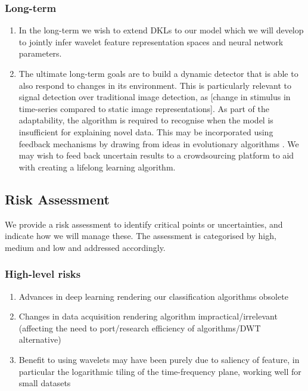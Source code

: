 \documentclass[12pt]{llncs}
\begin{document}
\subsubsection{Long-term}
\begin{enumerate}
	\item In the long-term we wish to extend DKLs to our model which we will develop to jointly infer wavelet feature representation spaces and neural network parameters.
	\item The ultimate long-term goals are to build a dynamic detector that is able to also respond to changes in its environment. This is particularly relevant to signal detection over traditional image detection, as [change in stimulus in time-series compared to static image representations]. As part of the adaptability, the algorithm is required to recognise when the model is insufficient for explaining novel data. This may be incorporated using feedback mechanisms by drawing from ideas in evolutionary algorithms \cite{coello2007evolutionary}. We may wish to feed back uncertain results to a crowdsourcing platform to aid with creating a lifelong learning algorithm.
\end{enumerate}



\subsection{Risk Assessment}
We provide a risk assessment to identify critical points or uncertainties, and indicate how we will manage these. The assessment is categorised by high, medium and low and addressed accordingly.

\subsubsection{High-level risks} 
\begin{enumerate} 
\item Advances in deep learning rendering our classification algorithms obsolete
\item Changes in data acquisition rendering algorithm impractical/irrelevant (affecting the need to port/research efficiency of algorithms/DWT alternative)
\item Benefit to using wavelets may have been purely due to saliency of feature, in particular the logarithmic tiling of the time-frequency plane, working well for small datasets

\end{enumerate}
\end{document}
